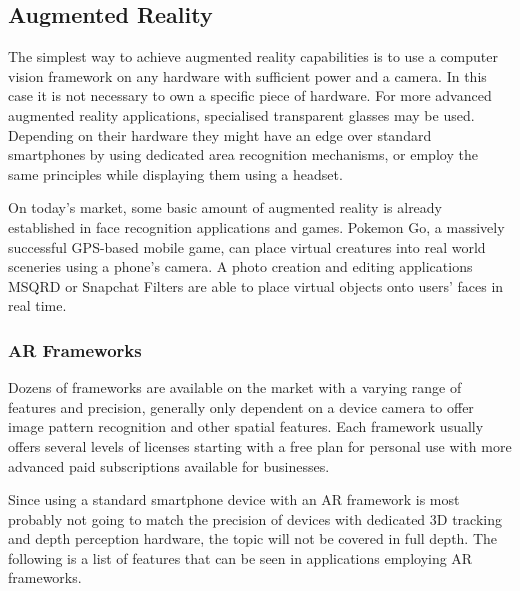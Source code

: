 \documentclass[12pt, a4paper]{article}
\begin{document}
\subsection{Augmented Reality}
The simplest way to achieve augmented reality capabilities is to use a computer vision framework on any hardware with sufficient power and a camera. In this case it is not necessary to own a specific piece of hardware. For more advanced augmented reality applications, specialised transparent glasses may be used. Depending on their hardware they might have an edge over standard smartphones by using dedicated area recognition mechanisms, or employ the same principles while displaying them using a headset.

On today’s market, some basic amount of augmented reality is already established in face recognition applications and games. Pokemon Go, a massively successful GPS-based mobile game, can place virtual creatures into real world sceneries using a phone’s camera. A photo creation and editing applications MSQRD or Snapchat Filters are able to place virtual objects onto users’ faces in real time.

\subsubsection{AR Frameworks}
Dozens of frameworks are available on the market with a varying range of features and precision, generally only dependent on a device camera to offer image pattern recognition and other spatial features. Each framework usually offers several levels of licenses starting with a free plan for personal use with more advanced paid subscriptions available for businesses.

Since using a standard smartphone device with an AR framework is most probably not going to match the precision of devices with dedicated 3D tracking and depth perception hardware, the topic will not be covered in full depth. The following is a list of features that can be seen in applications employing AR frameworks.
\end{document}
